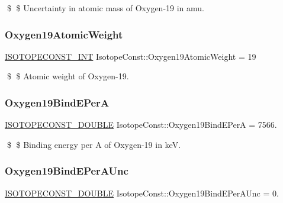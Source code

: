 \$ \$ Uncertainty in atomic mass of Oxygen-\/19 in amu. \mbox{\label{group___isotope_const-_oxygen-_o19_gab1120990541b301f60016e3874b4a0e4}} 
\subsubsection{\texorpdfstring{Oxygen19\+Atomic\+Weight}{Oxygen19AtomicWeight}}
{\footnotesize\ttfamily \mbox{\hyperlink{group___isotope_const-_macros_ga5f18360b3e99483a35c32d789e62621c}{I\+S\+O\+T\+O\+P\+E\+C\+O\+N\+S\+T\+\_\+\+I\+NT}} Isotope\+Const\+::\+Oxygen19\+Atomic\+Weight = 19}

\$ \$ Atomic weight of Oxygen-\/19. \mbox{\label{group___isotope_const-_oxygen-_o19_gafe6d72d545329ddd597537759071f584}} 
\subsubsection{\texorpdfstring{Oxygen19\+Bind\+E\+PerA}{Oxygen19BindEPerA}}
{\footnotesize\ttfamily \mbox{\hyperlink{group___isotope_const-_macros_ga8f45a7272ce02c0b4c65c44636ed719a}{I\+S\+O\+T\+O\+P\+E\+C\+O\+N\+S\+T\+\_\+\+D\+O\+U\+B\+LE}} Isotope\+Const\+::\+Oxygen19\+Bind\+E\+PerA = 7566.}

\$ \$ Binding energy per A of Oxygen-\/19 in keV. \mbox{\label{group___isotope_const-_oxygen-_o19_ga98fdfc9019921679ce86e8e3d566c7ae}} 
\subsubsection{\texorpdfstring{Oxygen19\+Bind\+E\+Per\+A\+Unc}{Oxygen19BindEPerAUnc}}
{\footnotesize\ttfamily \mbox{\hyperlink{group___isotope_const-_macros_ga8f45a7272ce02c0b4c65c44636ed719a}{I\+S\+O\+T\+O\+P\+E\+C\+O\+N\+S\+T\+\_\+\+D\+O\+U\+B\+LE}} Isotope\+Const\+::\+Oxygen19\+Bind\+E\+Per\+A\+Unc = 0.}

